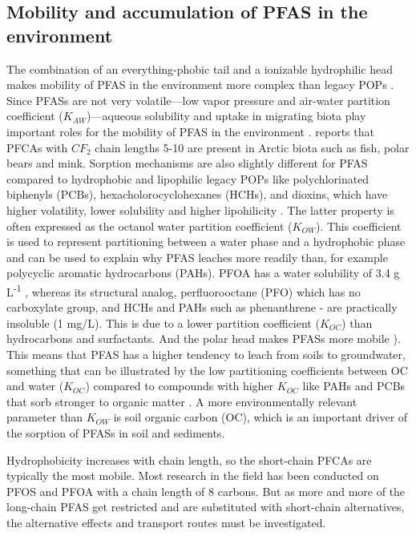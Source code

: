\subsection{Mobility and accumulation of PFAS in the environment}
The combination of an everything-phobic tail and a ionizable hydrophilic head makes mobility of PFAS in the environment more complex than legacy POPs \citep{cabrerizo2018legacy,Arp2006}. Since PFASs are not very volatile---low vapor pressure and air-water partition coefficient ($K_{AW}$)---aqueous solubility and uptake in migrating biota play important roles for the mobility of PFAS in the environment \citep{Arp2006}. \cite{Schlabach2017} reports that PFCAs with $CF_2$ chain lengths 5-10 are present in Arctic biota such as fish, polar bears and mink. Sorption mechanisms are also slightly different for PFAS compared to hydrophobic and lipophilic legacy POPs like polychlorinated biphenyls (PCBs), hexacholorocyclohexanes (HCHs), and dioxins, which have higher volatility, lower solubility and higher lipohilicity \citep{cabrerizo2018legacy,Cornelissen2005,li2018}. The latter property is often expressed as the octanol water partition coefficient (\(K_{OW}\)). This coefficient is used to represent partitioning between a water phase and a hydrophobic phase \citep{Reemtsma2016} and can be used to explain why PFAS leaches more readily than, for example polycyclic aromatic hydrocarbons (PAHs). PFOA has a water solubility of 3.4 g L\textsuperscript{-1} \citep{PFOA}, whereas its structural analog, perfluorooctane (PFO) \citep{PFO}  which has no carboxylate group, and HCHs and PAHs such as phenanthrene - are practically insoluble (1 mg/L). This is due to a lower partition coefficient ($K_{OC}$) than hydrocarbons and surfactants. And the polar head makes PFASs more mobile \citep{Cornelissen2005,du2014adsorption}). This means that PFAS has a higher tendency to leach from soils to groundwater, something that can be illustrated by the low partitioning coefficients between OC and water ($K_{OC}$) compared to compounds with higher $K_{OC}$ like PAHs and PCBs that sorb stronger to organic matter \citep{Cornelissen2005}. 
A more environmentally relevant parameter than \(K_{OW}\) is soil organic carbon (OC), which is an important driver of the sorption of PFASs in soil and sediments.

  Hydrophobicity increases with chain length, so the short-chain PFCAs are typically the most mobile. Most research in the field has been conducted on PFOS and PFOA with a chain length of 8 carbons. But as more and more of the long-chain PFAS get restricted and are substituted with short-chain alternatives, the alternative effects and transport routes must be investigated. 


